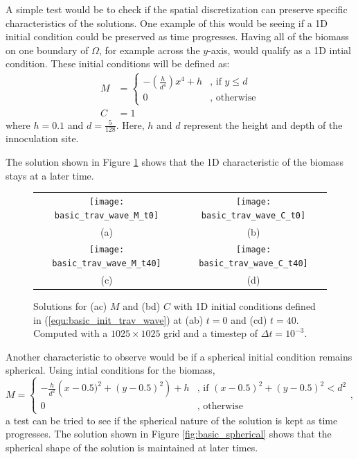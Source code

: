   A simple test would be to check if the spatial discretization can preserve specific characteristics of the solutions.
  One example of this would be seeing if a 1D initial condition could be preserved as time progresses.
  Having all of the biomass on one boundary of $\Omega$, for example across the $y$-axis, would qualify as a 1D intial condition.
  These initial conditions will be defined as:
  \begin{equation} \label{equ:basic_init_trav_wave}
    \begin{aligned}
    M &= \begin{cases}
      -\left( \frac{h}{d^4} \right) x^4 + h & \text{, if } y \le d \\
      0 & \text{, otherwise}
    \end{cases} \\
    C &= 1
    \end{aligned}
  \end{equation}
  where $h = 0.1$ and $d = \frac{5}{128}$.
  Here, $h$ and $d$ represent the height and depth of the innoculation site. 

  The solution shown in Figure \ref{fig:basic_trav} shows that the 1D characteristic of the biomass stays at a later time. 

  \begin{figure}
    \centering
    \begin{tabular}{c c}
      \texttt{[image: basic\_trav\_wave\_M\_t0]} & 
      \texttt{[image: basic\_trav\_wave\_C\_t0]} \\
      (a) & (b) \\
      \texttt{[image: basic\_trav\_wave\_M\_t40]} &
      \texttt{[image: basic\_trav\_wave\_C\_t40]}\\
      (c) & (d)
    \end{tabular}
    \caption{Solutions for (ac) $M$ and (bd) $C$ with 1D initial conditions defined in (\ref{equ:basic_init_trav_wave}) at (ab) $t = 0$ and (cd) $t = 40$. Computed with a $1025 \times 1025$ grid and a timestep of $\Delta t = 10^{-3}$.}
    \label{fig:basic_trav}
  \end{figure}

  Another characteristic to observe would be if a spherical initial condition remains spherical.
  Using intial conditions for the biomass,
  \begin{equation} \label{equ:basic_spherical}
    M = \begin{cases}
      - \frac{h}{d^2} \left( x - 0.5)^2 + (y - 0.5)^2 \right) + h  & \text{, if } (x - 0.5)^2 + (y - 0.5)^2 < d^2 \\
      0 & \text{, otherwise}
    \end{cases},
  \end{equation}
  a test can be tried to see if the spherical nature of the solution is kept as time progresses.
  The solution shown in Figure \ref{fig:basic_spherical} shows that the spherical shape of the solution is maintained at later times.

